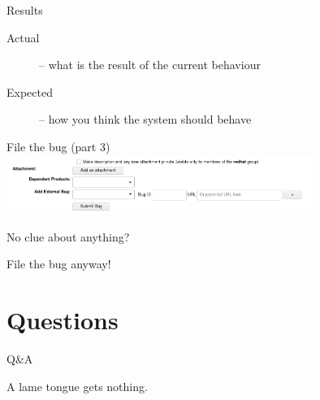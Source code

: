 \documentclass[12pt,aspectratio=169]{beamer}
\begin{document}
\begin{frame}{Results}
\begin{description}
	\item[Actual] -- what is the result of the current behaviour
	\item[Expected] -- how you think the system should behave
\end{description}
\end{frame}

\begin{frame}{File the bug (part 3)}
\includegraphics[width=10cm]{images/bz_footer.png}
\end{frame}

\begin{frame}{No clue about anything?}

{\Large File the bug anyway!}
\end{frame}

\section{Questions}

\begin{frame}{Q\&A}

{\Large A lame tongue gets nothing.}
\end{frame}
\end{document}
